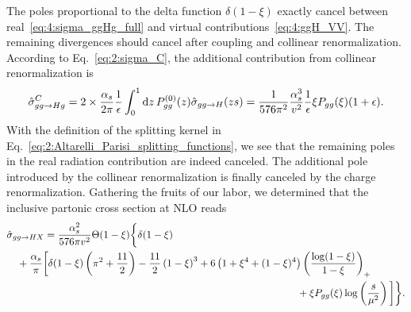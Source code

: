The poles proportional to the delta function $\delta (1 - \xi)$ exactly cancel between real~\eqref{eq:4:sigma_ggHg_full} and virtual contributions~\eqref{eq:4:ggH_VV}. The remaining divergences should cancel after coupling and collinear renormalization. According to Eq.~\eqref{eq:2:sigma_C}, the additional contribution from collinear renormalization is
\begin{equation}
\hat{\sigma}_{gg \rightarrow Hg}^C = 2 \times \frac{\alpha_s}{2 \pi} \frac{1}{\epsilon} \int_0^1 \mathrm{d} z\, P_{gg}^{(0)}(z) \hat{\sigma}_{gg \rightarrow H} (z s) = \frac{1}{576 \pi^2} \frac{\alpha_s^3}{v^2} \frac{1}{\epsilon} \xi P_{gg}(\xi) (1 + \epsilon).
\end{equation}
With the definition of the splitting kernel in Eq.~\eqref{eq:2:Altarelli_Parisi_splitting_functions}, we see that the remaining poles in the real radiation contribution are indeed canceled. The additional pole introduced by the collinear renormalization is finally canceled by the charge renormalization. Gathering the fruits of our labor, we determined that the inclusive partonic cross section at \acs{NLO} reads
\begin{equation}
\begin{split}
& \hat{\sigma}_{gg \rightarrow HX} = \frac{\alphas^2}{576 \pi v^2} \Theta(1 - \xi) \bigg \lbrace \delta(1 - \xi) \\
& \quad + \frac{\alphas}{\pi} \bigg [ \delta(1 - \xi) \left(\pi^2 + \frac{11}{2} \right) - \frac{11}{2} \left(1 - \xi \right)^3 + 6 \left( 1 + \xi^4 + (1 - \xi)^4 \right) \left(\frac{\log (1 - \xi)}{1 - \xi} \right)_+ \\
& \hspace{10cm} + \xi P_{gg}(\xi) \log \left(\frac{s}{\mu^2} \right) \bigg ] \bigg \rbrace .
\end{split}
\label{eq:4:ggHX_NLO_HTL_cross_section}
\end{equation}

